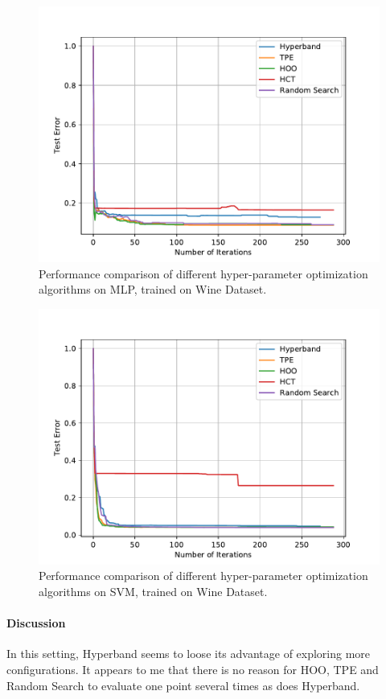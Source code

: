 \documentclass[runningheads,a4paper]{llncs}
\begin{document}
\begin{figure}[ht]
    \centering
    \includegraphics[scale=0.8]{img/uci/sk_mlp_0.pdf}
    \caption{Performance comparison of different hyper-parameter optimization algorithms on MLP, trained on Wine Dataset.}
    \label{sk_mlp_0}
\end{figure}

\begin{figure}[ht]
    \centering
    \includegraphics[scale=0.8]{img/uci/svm_0.pdf}
    \caption{Performance comparison of different hyper-parameter optimization algorithms on SVM, trained on Wine Dataset.}
    \label{svm_0}
\end{figure}

\paragraph{\textbf{Discussion}} In this setting, Hyperband seems to loose its advantage of exploring more configurations. It appears to me that there is no reason for HOO, TPE and Random Search to evaluate one point several times as does Hyperband.
\end{document}
